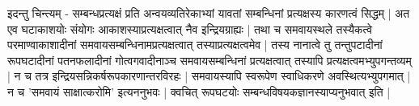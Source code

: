 इदन्तु चिन्त्यम् - सम्बन्धप्रत्यक्षं प्रति अन्वयव्यतिरेकाभ्यां यावतां सम्बन्धिनां प्रत्यक्षस्य कारणत्वं सिद्धम् | अत एव घटाकाशयोः संयोगः आकाशस्याप्रत्यक्षत्वात् नैव इन्द्रियग्राह्यः | तथा च समवायस्थले तस्यैकत्वे परमाण्वाकाशादीनां समवायसम्बन्धिनामप्रत्यक्षत्वात् तस्याप्रत्यक्षत्वमेव | तस्य नानात्वे तु तन्तुपटादीनां रूपघटादीनां पतनफलादीनां गोत्वगवादीनाञ्च समवायसम्बन्धिनां प्रत्यक्षत्वात् तस्यापि प्रत्यक्षत्वमभ्युपगन्तव्यम् | न च तत्र इन्द्रियसन्निकर्षरूपकारणान्तरविरहः | समवायस्यापि स्वरूपेण स्वाधिकरणे अवस्थित्यभ्युपगमात् | न च 'समवायं साक्षात्करोमि' इत्यननुभवः | क्वचित् रूपघटयोः सम्बन्धविषयकज्ञानस्याप्यनुभवात् इति |

